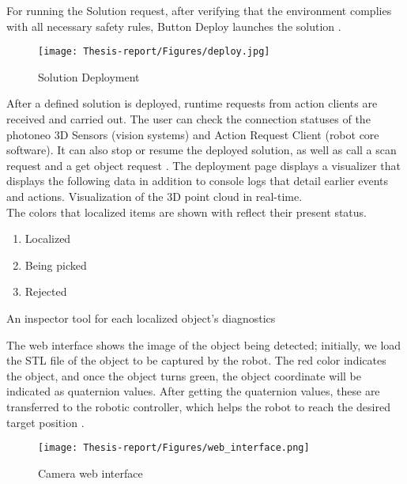 \documentclass[12pt]{article}
\begin{document}
For running the Solution request, after verifying that the environment complies with all necessary safety rules, Button Deploy launches the solution \cite{ref2}.\\

\begin{figure}[h]
    \centering
    \texttt{[image: Thesis-report/Figures/deploy.jpg]}
    \caption{Solution Deployment\cite{ref2}} 
    \label{fig:solution-deployment}
\end{figure}
    
After a defined solution is deployed, runtime requests from action clients are received and carried out.  The user can check the connection statuses of the photoneo 3D Sensors (vision systems) and Action Request Client (robot core software).  It can also stop or resume the deployed solution, as well as call a scan request and a get object request \cite{ref2}.
The deployment page displays a visualizer that displays the following data in addition to console logs that detail earlier events and actions. Visualization of the 3D point cloud in real-time. \\
\newpage
The colors that localized items are shown with reflect their present status\cite{ref2}.

\begin{enumerate}
    \item Localized \colorbox{green}\\ 
    \item Being picked \colorbox{blue}\\
    \item Rejected \colorbox{red}\\
\end{enumerate}

An inspector tool for each localized object's diagnostics\cite{ref2}

The web interface shows the image of the object being detected; initially, we load the STL file of the object to be captured by the robot. The red color indicates the object, and once the object turns green, the object coordinate will be indicated as quaternion values. After getting the quaternion values, these are transferred to the robotic controller, which helps the robot to reach the desired target position \cite{ref2}.

\begin{figure}[h]
    \centering
    \texttt{[image: Thesis-report/Figures/web\_interface.png]} 
    \caption{Camera web interface}
    \label{fig:web-interface}
\end{figure}
\end{document}
